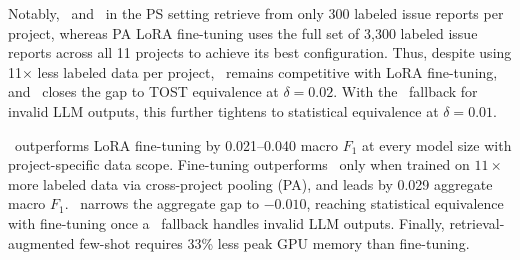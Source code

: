 
Notably, \ragtag\ and \bragtag\ in the PS setting retrieve from only 300 labeled issue reports per project, whereas PA LoRA fine-tuning uses the full set of 3{,}300 labeled issue reports across all 11 projects to achieve its best configuration. Thus, despite using 11$\times$ less labeled data per project, \ragtag\ remains competitive with LoRA fine-tuning, and \bragtag\ closes the gap to TOST equivalence at $\delta{=}0.02$. With the \votag\ fallback for invalid LLM outputs, this further tightens to statistical equivalence at $\delta{=}0.01$.

\begin{myboxi}
\ragtag\ outperforms LoRA fine-tuning by 0.021--0.040 macro $F_1$ at every model size with project-specific data scope. Fine-tuning outperforms \ragtag\ only when trained on $11\times$ more labeled data via cross-project pooling (PA), and leads by 0.029 aggregate macro $F_1$. \bragtag\ narrows the aggregate gap to $-0.010$, reaching statistical equivalence with fine-tuning once a \votag\ fallback handles invalid LLM outputs. Finally, retrieval-augmented few-shot requires 33\% less peak GPU memory than fine-tuning.
\end{myboxi}


